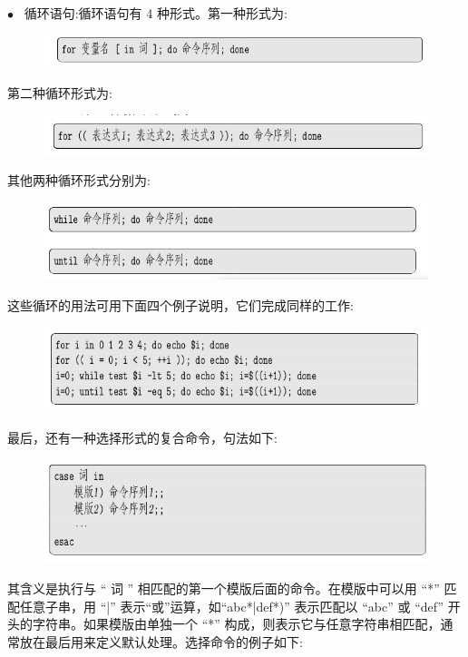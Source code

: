 \documentclass[12pt，a4paper]{article}
\numberwithin{equation}{section}
\begin{document}
$\bullet$~ 循环语句:循环语句有 4 种形式。第一种形式为:
\begin{figure}[H]
\centering
\includegraphics[scale=0.6]{./figures/254.png}
\end{figure}
第二种循环形式为:
\begin{figure}[H]
\centering
\includegraphics[scale=0.6]{./figures/255.png}
\end{figure}
其他两种循环形式分别为:
\begin{figure}[H]
\centering
\includegraphics[scale=0.6]{./figures/256.png}
\end{figure}
这些循环的用法可用下面四个例子说明，它们完成同样的工作:
\begin{figure}[H]
\centering
\includegraphics[scale=0.6]{./figures/257.png}
\end{figure}
最后，还有一种选择形式的复合命令，句法如下:
\begin{figure}[H]
\centering
\includegraphics[scale=0.6]{./figures/258.png}
\end{figure}
其含义是执行与 “ 词 ” 相匹配的第一个模版后面的命令。在模版中可以用 “*” 匹配任意子串，用 “|” 表示“或”运算，如“abc*|def*)” 表示匹配以 “abc” 或 “def” 开头的字符串。如果模版由单独一个 “*” 构成，则表示它与任意字符串相匹配，通常放在最后用来定义默认处理。选择命令的例子如下:
\end{document}
